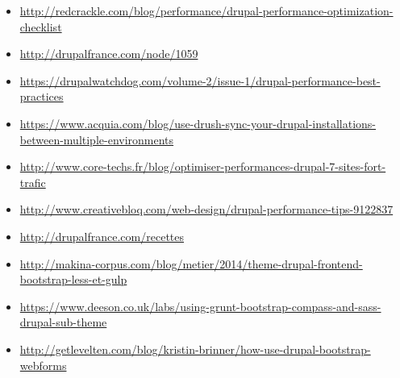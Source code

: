 \documentclass[a4paper,11pt,french]{rtdsphinxmanual}
\begin{document}
\begin{itemize}
\item {} 
\href{http://redcrackle.com/blog/performance/drupal-performance-optimization-checklist}{http://redcrackle.com/blog/performance/drupal-performance-optimization-checklist}

\item {} 
\href{http://drupalfrance.com/node/1059}{http://drupalfrance.com/node/1059}

\item {} 
\href{https://drupalwatchdog.com/volume-2/issue-1/drupal-performance-best-practices}{https://drupalwatchdog.com/volume-2/issue-1/drupal-performance-best-practices}

\item {} 
\href{https://www.acquia.com/blog/use-drush-sync-your-drupal-installations-between-multiple-environments}{https://www.acquia.com/blog/use-drush-sync-your-drupal-installations-between-multiple-environments}

\item {} 
\href{http://www.core-techs.fr/blog/optimiser-performances-drupal-7-sites-fort-trafic}{http://www.core-techs.fr/blog/optimiser-performances-drupal-7-sites-fort-trafic}

\item {} 
\href{http://www.creativebloq.com/web-design/drupal-performance-tips-9122837}{http://www.creativebloq.com/web-design/drupal-performance-tips-9122837}

\end{itemize}


\begin{itemize}
\item {} 
\href{http://drupalfrance.com/recettes}{http://drupalfrance.com/recettes}

\item {} 
\href{http://makina-corpus.com/blog/metier/2014/theme-drupal-frontend-bootstrap-less-et-gulp}{http://makina-corpus.com/blog/metier/2014/theme-drupal-frontend-bootstrap-less-et-gulp}

\item {} 
\href{https://www.deeson.co.uk/labs/using-grunt-bootstrap-compass-and-sass-drupal-sub-theme}{https://www.deeson.co.uk/labs/using-grunt-bootstrap-compass-and-sass-drupal-sub-theme}

\item {} 
\href{http://getlevelten.com/blog/kristin-brinner/how-use-drupal-bootstrap-webforms}{http://getlevelten.com/blog/kristin-brinner/how-use-drupal-bootstrap-webforms}

\end{itemize}
\end{document}
